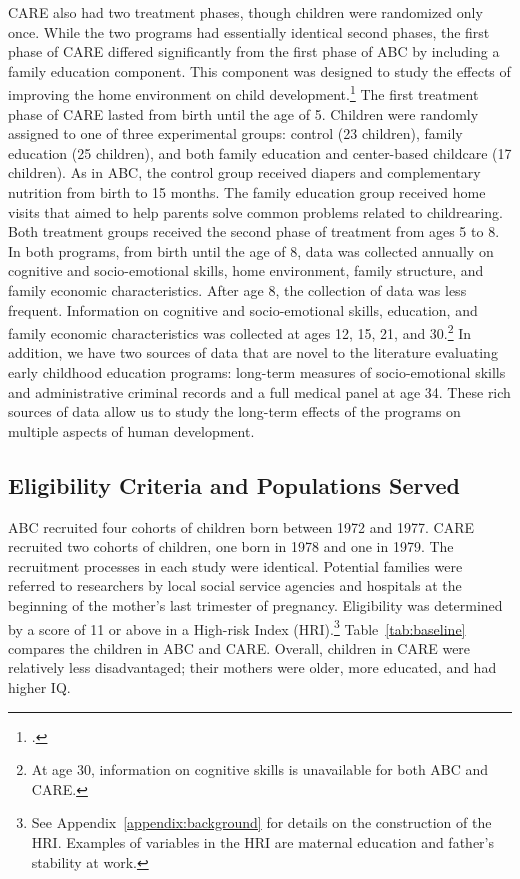 \noindent  CARE also had two treatment phases, though children were randomized only once. While the two programs had essentially identical second phases, the first phase of CARE differed significantly from the first phase of ABC by including a family education component. This component was designed to study the effects of improving the home environment on child development.\footnote{\citet{Wasik_Ramey_etal_1990_CD}.} The first treatment phase of CARE lasted from birth until the age of 5. Children were randomly assigned to one of three experimental groups: control (23 children), family education (25 children), and both family education and center-based childcare (17 children). As in ABC, the control group received diapers and complementary nutrition from birth to 15 months. The family education group received home visits that aimed to help parents solve common problems related to childrearing. Both treatment groups received the second phase of treatment from ages 5 to 8.\\

\noindent In both programs, from birth until the age of 8, data was collected annually on cognitive and socio-emotional skills, home environment, family structure, and family economic characteristics. After age 8, the collection of data was less frequent. Information on cognitive and socio-emotional skills, education, and family economic characteristics was collected at ages 12, 15, 21, and 30.\footnote{At age 30, information on cognitive skills is unavailable for both ABC and CARE.} In addition, we have two sources of data that are novel to the literature evaluating early childhood education programs: long-term measures of socio-emotional skills and administrative criminal records and a full medical panel at age 34. These rich sources of data allow us to study the long-term effects of the programs on multiple aspects of human development.

\subsection{Eligibility Criteria and Populations Served} \label{section:eligibility}

\noindent ABC recruited four cohorts of children born between 1972 and 1977. CARE recruited two cohorts of children, one born in 1978 and one in 1979. The recruitment processes in each study were identical. Potential families were referred to researchers by local social service agencies and hospitals at the beginning of the mother's last trimester of pregnancy. Eligibility was determined by a score of 11 or above in a High-risk Index (HRI).\footnote{See Appendix~\ref{appendix:background} for details on the construction of the HRI. Examples of variables in the HRI are maternal education and father's stability at work.} Table~\ref{tab:baseline} compares the children in ABC and CARE. Overall, children in CARE were relatively less disadvantaged; their mothers were older, more educated, and had higher IQ.

